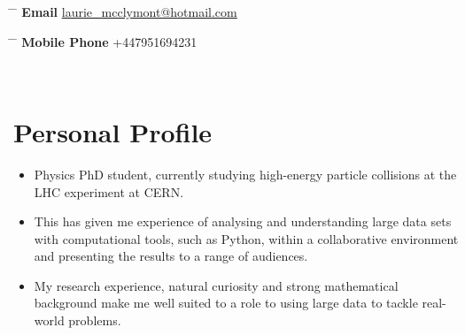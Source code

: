 \documentclass[10pt]{article} %
\begin{document}

\title{} %
\vspace{-5mm}


\parbox{0.5\textwidth}{ %
\begin{tabbing} %
\hspace{2cm} \= \hspace{3cm} \= \kill %
{\bf Email} \> \href{mailto:laurie_mcclymont@hotmail.com}{laurie\_mcclymont@hotmail.com} \\ %
\end{tabbing}}
\hspace{2cm} %
\parbox{0.5\textwidth}{ %
\begin{tabbing} %
\hspace{3cm} \= \hspace{4cm} \= \kill %
{\bf Mobile Phone} \> +447951694231 \\ %
\end{tabbing}}
\vspace{-10mm}\\ %


\section{Personal Profile}
\begin{itemize}
\item{Physics PhD student, currently studying high-energy particle collisions at the LHC experiment at CERN.}
\item{This has given me experience of analysing and understanding large data sets with computational tools, such as Python, within
  a collaborative environment and presenting the results to a range of audiences.}
\item{My research experience, natural curiosity and strong mathematical background make me well suited to a role to using large data to tackle real-world problems.}


\end{itemize}
\end{document}
